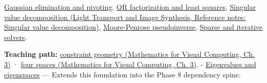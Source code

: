 \hyperref[appendix-f6e77f4a200f]{Gaussian elimination and pivoting}, \hyperref[appendix-c3421e6b4f2c]{QR factorization and least squares}, \href{../04-Light-Transport-and-Image-Synthesis/main.pdf\#nameddest=appendix-1fad5e7f36fa}{Singular value decomposition (Light Transport and Image Synthesis, Reference notes: Singular value decomposition)}, \hyperref[appendix-541306fdbc1b]{Moore-Penrose pseudoinverse}, \hyperref[appendix-67c87a3d9e94]{Sparse and iterative solvers}.

\textbf{Teaching path:} \href{../02-Mathematics-for-Visual-Computing/main.pdf\#nameddest=01-foundations-i-ch019-a-linear-equation-is-a-measurement-and-several-equations-are-geometry}{constraint geometry (Mathematics for Visual Computing, Ch. 3)} · \href{../02-Mathematics-for-Visual-Computing/main.pdf\#nameddest=01-foundations-i-ch019-rank-separates-what-the-measurements-determine-from-what-they-leave-free}{four spaces (Mathematics for Visual Computing, Ch. 3)}. - \hyperref[appendix-0b3be18411f9]{Eigenvalues and eigenspaces} --- Extends this foundation into the Phase 8 dependency spine.
